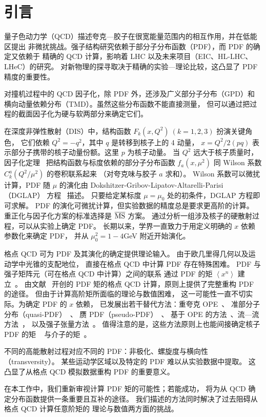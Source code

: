 \section{引言}
量子色动力学（QCD）描述夸克—胶子在很宽能量范围内的相互作用，并在低能区提出
非微扰挑战。强子结构研究依赖于部分子分布函数（PDF），而 PDF 的确定又依赖于
精确的 QCD 计算，影响着 LHC 以及未来项目（EIC、HL-LHC、LHeC）的研究。
对新物理的探寻取决于精确的实验—理论比较，这凸显了 PDF 精度的重要性。

对撞机过程中的 QCD 因子化，除 PDF 外，还涉及广义部分子分布（GPD）和
横向动量依赖分布（TMD）。虽然这些分布函数不能直接测量，
但可以通过把过程的截面因子化为硬与软两部分来确定它们。

在深度非弹性散射（DIS）中，结构函数 $F_k(x,Q^2)~(k=1,2,3)$ 扮演关键角色，
它们依赖 $Q^2=-q^2$，其中 $q$ 是转移到核子上的 4 动量，
$x = Q^2/2(pq)$ 表示部分子携带的核子动量份额。这里 $p$ 为核子动量。
当 $Q^2$ 远大于核子质量时，因子化定理~\cite{Collins:1989gx}
把结构函数与标度依赖的部分子分布函数 $f_a(x,\mu^2)$
同 Wilson 系数 $C_k^a(Q^2/\mu^2)$ 的卷积联系起来
（对夸克味与胶子 $a$ 求和）。
Wilson 系数可以微扰计算，PDF 随 $\mu$ 的演化由
Dokshitzer-Gribov-Lipatov-Altarelli-Parisi（DGLAP）
方程~\cite{Gribov:1972ri,Lipatov:1974qm,Dokshitzer:1977sg,Altarelli:1977zs} 描述。
只要给定某标度 $\mu=\mu_0$ 处的初条件，DGLAP 方程即可求解。
PDF 的演化可微扰计算，但实验数据的精度总是要求更高阶的计算。
重正化与因子化方案的标准选择是 $\overline {\text{MS}}$ 方案。
通过分析一组涉及核子的硬散射过程，可以从实验上确定 PDF。
长期以来，学界一直致力于用定义明确的 $x$ 依赖参数化来确定 PDF，
并从 $\mu_0^2 = 1 - 4$GeV 附近开始演化。

格点 QCD 可为 PDF 及其演化的确定提供理论输入。
由于欧几里得几何以及运动学中光锥的支配地位，
直接在格点 QCD 中计算 PDF 存在特殊困难。
PDF 与强子矩阵元（可在格点 QCD 中计算）之间的联系
通过 PDF 的矩 $\left\langle x^{n} \right\rangle$ 建立~\cite{Curci:1980uw,Collins:1981uw}。
由文献~\cite{Kronfeld:1984zv,Martinelli:1987zd,Martinelli:1987bh} 开创的
PDF 矩的格点 QCD 计算，原则上提供了完整重构 PDF 的途径。
但由于计算高阶矩所面临的理论与数值困难，
这一可能性一直不切实际。为确定 PDF 的 $x$ 依赖，
已发展出若干替代方法：重夸克 OPE~\cite{Aglietti:1998mz,Detmold:2005gg}、
准部分子分布（quasi-PDF）~\cite{Ji:2013dva}、
赝 PDF（pseudo-PDF）~\cite{Radyushkin:2016hsy,Karpie:2018zaz}、
基于 OPE 的方法~\cite{Chambers:2017dov}、流—流方法~\cite{Braun:2007wv,Ma:2014jla}，
以及强子张量方法~\cite{Liang:2019frk}。
值得注意的是，这些方法原则上也能间接确定核子 PDF 的矩
~\cite{HadStruc:2021qdf,Gao:2022uhg} 与介子的矩~\cite{Gao:2020ito,Gao:2022iex}。

不同的高能散射过程对应不同的 PDF：非极化、螺旋度与横向性（transversity）。
某些运动学区域以及特定的 PDF 难以从实验数据中提取。
这凸显了从格点 QCD 模拟数据重构 PDF 的重要意义。

在本工作中，我们重新审视计算 PDF 矩的可能性；若能成功，
将为从 QCD 确定分布函数提供一条重要且互补的途径。
我们描述的方法同时解决了过去阻碍从格点 QCD 计算任意阶矩的
理论与数值两方面的挑战。

